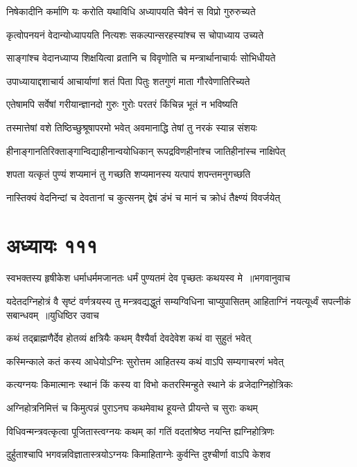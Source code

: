 \twolineshloka
{निषेकादीनि कर्माणि यः करोति यथाविधि}
{अध्यापयति चैवेनं स विप्रो गुरुरुच्यते}


\twolineshloka
{कृत्वोपनयनं वेदान्योध्यापयति नित्यशः}
{सकल्पान्सरहस्यांश्च स चोपाध्याय उच्यते}


\twolineshloka
{साङ्गांश्च वेदानध्याप्य शिक्षयित्वा व्रतानि च}
{विवृणोति च मन्त्रार्थानाचार्यः सोभिधीयते}


\twolineshloka
{उपाध्यायाद्दशाचार्य आचार्याणां शतं पिता}
{पितुः शतगुणं माता गौरवेणातिरिच्यते}


\twolineshloka
{एतेषामपि सर्वेषां गरीयान्ज्ञानदो गुरुः}
{गुरोः परतरं किंचिन्न भूतं न भविष्यति}


\twolineshloka
{तस्मात्तेषां वशे तिष्ठिच्छुश्रूषापरमो भवेत्}
{अवमानाद्धि तेषां तु नरकं स्यान्न संशयः}


\twolineshloka
{हीनाङ्गानतिरिक्ताङ्गान्विद्याहीनान्वयोधिकान्}
{रूपद्रविणहीनांश्च जातिहीनांस्च नाक्षिपेत्}


\twolineshloka
{शपता यत्कृतं पुण्यं शप्यमानं तु गच्छति}
{शप्यमानस्य यत्पापं शपन्तमनुगच्छति}


\twolineshloka
{नास्तिक्यं वेदनिन्दां च देवतानां च कुत्सनम्}
{द्वेषं डंभं च मानं च क्रोधं तैक्ष्ण्यं विवर्जयेत्}


\chapter{अध्यायः १११}
\threelineshloka
{स्वभक्तस्य हृषीकेश धर्माधर्ममजानतः}
{धर्मं पुण्यतमं देव पृच्छतः कथयस्व मे ॥भगवानुवाच}
{}


\fourlineindentedshloka
{यदेतदग्निहोत्रं वै सृष्टं वर्णत्रयस्य तु}
{मन्त्रवद्यद्धुतं सम्यग्विधिना चाप्युपासितम्}
{आहिताग्निं नयत्यूर्ध्वं सपत्नीकं सबान्धवम् ॥युधिष्ठिर उवाच}
{}


\twolineshloka
{कथं तद्ब्राह्मणैर्देव होतव्यं क्षत्रियैः कथम्}
{वैश्यैर्वा देवदेवेश कथं वा सुहुतं भवेत्}


\twolineshloka
{कस्मिन्काले कतं कस्य आधेयोऽग्निः सुरोत्तम}
{आहितस्य कथं वाऽपि सम्यगाचरणं भवेत्}


\twolineshloka
{कत्यग्नयः किमात्मानः स्थानं किं कस्य वा विभो}
{कतरस्मिन्हुते स्थाने कं व्रजेदाग्निहोत्रिकः}


\twolineshloka
{अग्निहोत्रनिमित्तं च किमुत्पन्नं पुराऽनघ}
{कथमेवाथ हूयन्ते प्रीयन्ते च सुराः कथम्}


\twolineshloka
{विधिवन्मन्त्रवत्कृत्वा पूजितास्त्वग्नयः कथम्}
{कां गतिं वदतांश्रेष्ठ नयन्ति ह्यग्निहोत्रिणः}


\twolineshloka
{दुर्हुताश्चापि भगवन्नविज्ञातास्त्रयोऽग्नयः}
{किमाहिताग्नेः कुर्वन्ति दुश्चीर्णा वाऽपि केशव}


